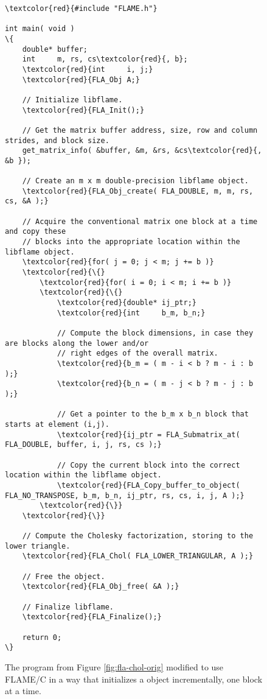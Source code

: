 \begin{figure}[t]
\begin{Verbatim}[frame=single,framesep=2.5mm,xleftmargin=5mm,commandchars=\\\{\},fontsize=\footnotesize]
\textcolor{red}{#include "FLAME.h"}

int main( void )
\{
    double* buffer;
    int     m, rs, cs\textcolor{red}{, b};
    \textcolor{red}{int     i, j;}
    \textcolor{red}{FLA_Obj A;}

    // Initialize libflame.
    \textcolor{red}{FLA_Init();}

    // Get the matrix buffer address, size, row and column strides, and block size.
    get_matrix_info( &buffer, &m, &rs, &cs\textcolor{red}{, &b });

    // Create an m x m double-precision libflame object.
    \textcolor{red}{FLA_Obj_create( FLA_DOUBLE, m, m, rs, cs, &A );}

    // Acquire the conventional matrix one block at a time and copy these
    // blocks into the appropriate location within the libflame object.
    \textcolor{red}{for( j = 0; j < m; j += b )}
    \textcolor{red}{\{}
        \textcolor{red}{for( i = 0; i < m; i += b )}
        \textcolor{red}{\{}
            \textcolor{red}{double* ij_ptr;}
            \textcolor{red}{int     b_m, b_n;}

            // Compute the block dimensions, in case they are blocks along the lower and/or
            // right edges of the overall matrix.
            \textcolor{red}{b_m = ( m - i < b ? m - i : b );}
            \textcolor{red}{b_n = ( m - j < b ? m - j : b );}

            // Get a pointer to the b_m x b_n block that starts at element (i,j).
            \textcolor{red}{ij_ptr = FLA_Submatrix_at( FLA_DOUBLE, buffer, i, j, rs, cs );}

            // Copy the current block into the correct location within the libflame object.
            \textcolor{red}{FLA_Copy_buffer_to_object( FLA_NO_TRANSPOSE, b_m, b_n, ij_ptr, rs, cs, i, j, A );}
        \textcolor{red}{\}}
    \textcolor{red}{\}}

    // Compute the Cholesky factorization, storing to the lower triangle.
    \textcolor{red}{FLA_Chol( FLA_LOWER_TRIANGULAR, A );}

    // Free the object.
    \textcolor{red}{FLA_Obj_free( &A );}

    // Finalize libflame.
    \textcolor{red}{FLA_Finalize();}

    return 0;
\}
\end{Verbatim}
\caption{
The program from Figure \ref{fig:fla-chol-orig} modified to use FLAME/C
in a way that initializes a \libflame object incrementally, one block at a
time.
}
\label{fig:fla-chol-native2}
\end{figure}

